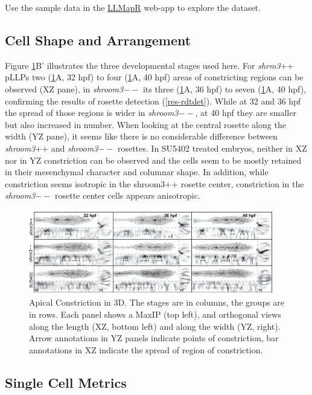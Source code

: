\documentclass[11pt,singlespacinge,twoside]{reedthesis} %
\begin{document}
Use the sample data in the \href{https://dskleinhans.shinyapps.io/LLmapR/}{LLMapR} web-app to explore the dataset.

\hypertarget{cell-shape-and-arrangement}{%
\subsection{Cell Shape and Arrangement}\label{cell-shape-and-arrangement}}

Figure \ref{fig:acshape}B' illustrates the three developmental stages used here. For \emph{shrm3}++ pLLPs two (\ref{fig:acshape}A, 32 hpf) to four (\ref{fig:acshape}A, 40 hpf) areas of constricting regions can be observed (XZ pane), in \emph{shroom3}\(--\) its three (\ref{fig:acshape}A, 36 hpf) to seven (\ref{fig:acshape}A, 40 hpf), confirming the results of rosette detection (\ref{res-rdtdet}). While at 32 and 36 hpf the spread of those regions is wider in \emph{shroom3}\(--\), at 40 hpf they are smaller but also increased in number. When looking at the central rosette along the width (YZ pane), it seems like there is no considerable difference between \emph{shroom3}++ and \emph{shroom3}\(--\) rosettes. In SU5402 treated embryos, neither in XZ nor in YZ constriction can be observed and the cells seem to be mostly retained in their mesenchymal character and columnar shape. In addition, while constriction seems isotropic in the shroom3++ rosette center, constriction in the \emph{shroom3}\(--\) rosette center cells appears anisotropic.


\begin{figure}

{\centering \includegraphics[width=0.95\textwidth]{figures/results/04_constriction/Figure_5-1} 

}

\caption[Apical Constriction in 3D]{Apical Constriction in 3D. The stages are in columns, the groups are in rows. Each panel shows a MaxIP (top left), and orthogonal views along the length (XZ, bottom left) and along the width (YZ, right). Arrow annotations in YZ panels indicate points of constriction, bar annotations in XZ indicate the spread of region of constriction.}\label{fig:acshape}
\end{figure}
\hypertarget{single-cell-metrics}{%
\subsection{Single Cell Metrics}\label{single-cell-metrics}}
\end{document}
